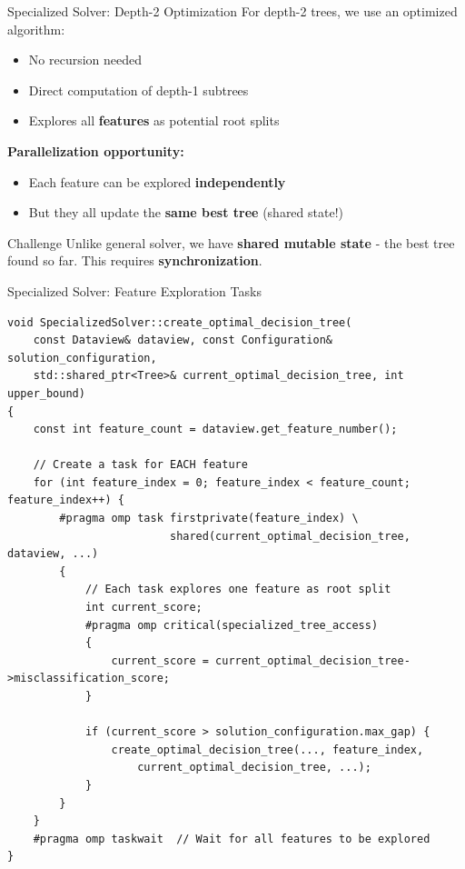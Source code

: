 \documentclass{beamer}
\begin{document}
\begin{frame}{Specialized Solver: Depth-2 Optimization}
For depth-2 trees, we use an optimized algorithm:
\begin{itemize}
    \item No recursion needed
    \item Direct computation of depth-1 subtrees
    \item Explores all \textbf{features} as potential root splits
\end{itemize}

\vspace{0.5em}
\textbf{Parallelization opportunity:}
\begin{itemize}
    \item Each feature can be explored \textbf{independently}
    \item But they all update the \textbf{same best tree} (shared state!)
\end{itemize}

\begin{alertblock}{Challenge}
Unlike general solver, we have \textbf{shared mutable state} - the best tree found so far.
This requires \textbf{synchronization}.
\end{alertblock}
\end{frame}

\begin{frame}[fragile]{Specialized Solver: Feature Exploration Tasks}
\begin{lstlisting}
void SpecializedSolver::create_optimal_decision_tree(
    const Dataview& dataview, const Configuration& solution_configuration,
    std::shared_ptr<Tree>& current_optimal_decision_tree, int upper_bound) 
{
    const int feature_count = dataview.get_feature_number();
    
    // Create a task for EACH feature
    for (int feature_index = 0; feature_index < feature_count; feature_index++) {
        #pragma omp task firstprivate(feature_index) \
                         shared(current_optimal_decision_tree, dataview, ...)
        {
            // Each task explores one feature as root split
            int current_score;
            #pragma omp critical(specialized_tree_access)
            {
                current_score = current_optimal_decision_tree->misclassification_score;
            }
            
            if (current_score > solution_configuration.max_gap) {
                create_optimal_decision_tree(..., feature_index, 
                    current_optimal_decision_tree, ...);
            }
        }
    }
    #pragma omp taskwait  // Wait for all features to be explored
}
\end{lstlisting}
\end{frame}
\end{document}
